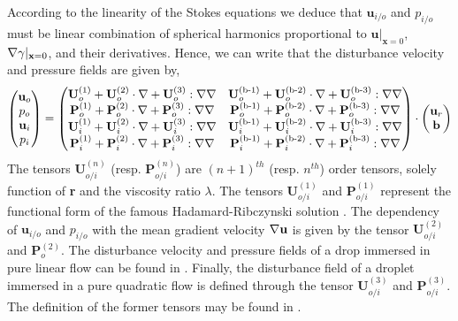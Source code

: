 According to the linearity of the Stokes equations we deduce that $\textbf{u}_{i/o}$ and $p_{i/o}$  must be linear combination of spherical harmonics proportional to $\textbf{u}|_{\textbf{x}=0}$, $\mathbf{\nabla} \gamma|_{\textbf{x}=0}$, and their derivatives.
Hence, we can write that the disturbance velocity and pressure fields are given by, 
\begin{align*}
    \begin{pmatrix}
        \textbf{u}_{o}\\
        p_{o}\\
        \textbf{u}_{i}\\
        p_{i}
    \end{pmatrix}
    =
    \begin{pmatrix}
        \textbf{U}_{o}^{(1)} + \textbf{U}_{o}^{(2)}\cdot \mathbf{\nabla} + \textbf{U}_{o}^{(3)} :\mathbf{\nabla}\mathbf{\nabla} &
        \textbf{U}_{o}^\text{(b-1)} + \textbf{U}_{o}^\text{(b-2)}\cdot \mathbf{\nabla} + \textbf{U}_{o}^\text{(b-3)} :\mathbf{\nabla}\mathbf{\nabla} \\
        \textbf{P}_{o}^{(1)} + \textbf{P}_{o}^{(2)}\cdot \mathbf{\nabla} + \textbf{P}_{o}^{(3)} :\mathbf{\nabla}\mathbf{\nabla} &
        \textbf{P}_{o}^\text{(b-1)} + \textbf{P}_{o}^\text{(b-2)}\cdot \mathbf{\nabla} + \textbf{P}_{o}^\text{(b-3)} :\mathbf{\nabla}\mathbf{\nabla} \\
        \textbf{U}_{i}^{(1)} + \textbf{U}_{i}^{(2)}\cdot \mathbf{\nabla} + \textbf{U}_{i}^{(3)} :\mathbf{\nabla}\mathbf{\nabla} &
        \textbf{U}_{i}^\text{(b-1)} + \textbf{U}_{i}^\text{(b-2)}\cdot \mathbf{\nabla} + \textbf{U}_{i}^\text{(b-3)} :\mathbf{\nabla}\mathbf{\nabla} \\
        \textbf{P}_{i}^{(1)} + \textbf{P}_{i}^{(2)}\cdot \mathbf{\nabla} + \textbf{P}_{i}^{(3)} :\mathbf{\nabla}\mathbf{\nabla} &
        \textbf{P}_{i}^\text{(b-1)} + \textbf{P}_{i}^\text{(b-2)}\cdot \mathbf{\nabla} + \textbf{P}_{i}^\text{(b-3)} :\mathbf{\nabla}\mathbf{\nabla} \\
    \end{pmatrix}
    \cdot 
    \begin{pmatrix}
        \textbf{u}_r\\
        \textbf{b}
    \end{pmatrix}
\end{align*}
The tensors $\textbf{U}^{(n)}_{o/i}$ (resp. $\textbf{P}^{(n)}_{o/i}$) are $(n+1)^{th}$ (resp. $n^{th}$) order tensors, solely function of \textbf{r} and the viscosity ratio $\lambda$. 
The tensors $\textbf{U}_{o/i}^{(1)}$ and $\textbf{P}_{o/i}^{(1)}$ represent the functional form of the famous Hadamard-Ribczynski solution \citep{pozrikidis1992boundary,kim2013microhydrodynamics}. 
The dependency of $\textbf{u}_{i/o}$ and $p_{i/o}$ with the mean gradient velocity $\mathbf{\nabla} \textbf{u}$ is given by the tensor $\textbf{U}_{o/i}^{(2)}$ and $\textbf{P}_{o}^{(2)}$.
The disturbance velocity and pressure fields of a drop immersed in pure linear flow can be found in \citet{rallison1978note,leal2007advanced,raja2010inertial}. 
Finally, the disturbance field of a droplet immersed in a pure quadratic flow is defined through the tensor $\textbf{U}_{o/i}^{(3)}$ and $\textbf{P}_{o/i}^{(3)}$.
The definition of the former tensors may be found in \citet{nadim1991motion}.




